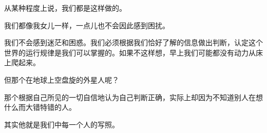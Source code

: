 从某种程度上说，我们都是这样做的。

我们都像我女儿一样，一点儿也不会因此感到困扰。

我们不会感到迷茫和困惑。我们必须根据我们恰好了解的信息做出判断，认定这个世界的运行规律是我们可以掌握的。如果不这样想，早上我们可能都没有动力从床上爬起来。

但那个在地球上空盘旋的外星人呢？

那个根据自己所见的一切自信地认为自己判断正确，实际上却因为不知道别人在想什么而大错特错的人。

其实他就是我们中每一个人的写照。
